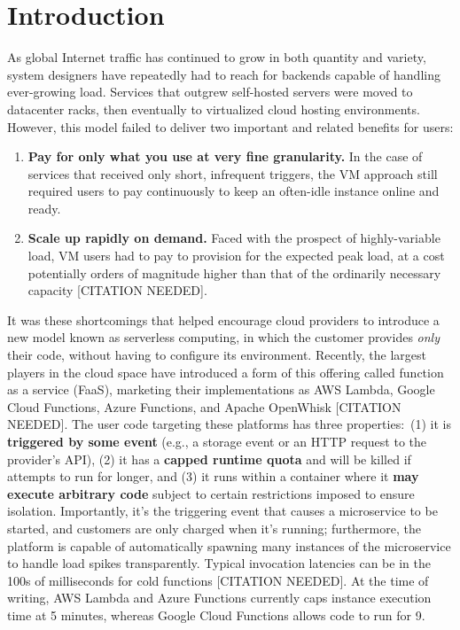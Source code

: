 \section{Introduction}
\label{sec:intro}

As global Internet traffic has continued to grow in both quantity and variety, system designers have repeatedly had to reach for backends capable of handling ever-growing load.
Services that outgrew self-hosted servers were moved to datacenter racks, then eventually to virtualized cloud hosting environments.
However, this model failed to deliver two important and related benefits for users:
\begin{enumerate}
\item \textbf{Pay for only what you use at very fine granularity.} In the case of services that received only short, infrequent triggers, the VM approach still required users to pay continuously to keep an often-idle instance online and ready.
\item \textbf{Scale up rapidly on demand.} Faced with the prospect of highly-variable load, VM users had to pay to provision for the expected peak load, at a cost potentially orders of magnitude higher than that of the ordinarily necessary capacity [CITATION NEEDED].
\end{enumerate}

It was these shortcomings that helped encourage cloud providers to introduce a new model known as serverless computing, in which the customer provides \textit{only} their code, without having to configure its environment.
Recently, the largest players in the cloud space have introduced a form of this offering called function as a service (FaaS), marketing their implementations as AWS Lambda, Google Cloud Functions, Azure Functions, and Apache OpenWhisk [CITATION NEEDED].
The user code targeting these platforms has three properties:\ (1) it is \textbf{triggered by some event} (e.g., a storage event or an HTTP request to the provider's API), (2) it has a \textbf{capped runtime quota} and will be killed if attempts to run for longer, and (3) it runs within a container where it \textbf{may execute arbitrary code} subject to certain restrictions imposed to ensure isolation.
Importantly, it's the triggering event that causes a microservice to be started, and customers are only charged when it's running; furthermore, the platform is capable of automatically spawning many instances of the microservice to handle load spikes transparently.
Typical invocation latencies can be in the 100s of milliseconds for cold functions [CITATION NEEDED].
At the time of writing, AWS Lambda and Azure Functions currently caps instance execution time at 5 minutes, whereas Google Cloud Functions allows code to run for 9.

